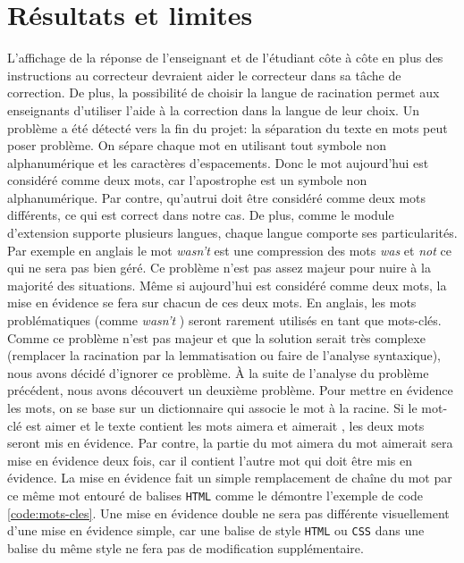 \chapter{R\'esultats et limites}
L'affichage de la r\'eponse de l'enseignant et de l'\'etudiant c\^ote \`a c\^ote en plus des instructions au correcteur devraient aider le correcteur dans sa t\^ache de correction.
De plus, la possibilit\'e de choisir la langue de racination permet aux enseignants d'utiliser l'aide \`a la correction dans la langue de leur choix.
Un probl\`eme a \'et\'e d\'etect\'e vers la fin du projet: la s\'eparation du texte en mots peut poser probl\`eme.
On s\'epare chaque mot en utilisant tout symbole non alphanum\'erique et les caract\`eres d'espacements.
Donc le mot \og aujourd'hui \fg{} est consid\'er\'e comme deux mots, car l'apostrophe est un symbole non alphanum\'erique.
Par contre, \og qu'autrui \fg{} doit \^etre consid\'er\'e comme deux mots diff\'erents, ce qui est correct dans notre cas.
De plus, comme le module d'extension supporte plusieurs langues, chaque langue comporte ses particularit\'es.
Par exemple en anglais le mot \og \textit{wasn't} \fg{} est une compression des mots \og \textit{was} \fg{} et \og \textit{not} \fg{} ce qui ne sera pas bien g\'er\'e.
Ce probl\`eme n'est pas assez majeur pour nuire \`a la majorit\'e des situations.
M\^eme si \og aujourd'hui \fg{} est consid\'er\'e comme deux mots, la mise en \'evidence se fera sur chacun de ces deux mots.
En anglais, les mots probl\'ematiques (comme \og \textit{wasn't} \fg{}) seront rarement utilis\'es en tant que mots-cl\'es.
Comme ce probl\`eme n'est pas majeur et que la solution serait tr\`es complexe (remplacer la racination par la lemmatisation ou faire de l'analyse syntaxique), nous avons d\'ecidé d'ignorer ce probl\`eme.
\`A la suite de l'analyse du probl\`eme pr\'ec\'edent, nous avons d\'ecouvert un deuxi\`eme probl\`eme.
Pour mettre en \'evidence les mots, on se base sur un dictionnaire qui associe le mot \`a la racine.
Si le mot-cl\'e est \og aimer \fg{} et le texte contient les mots \og aimera \fg{} et \og aimerait \fg{}, les deux mots seront mis en \'evidence.
Par contre, la partie du mot \og aimera \fg{} du mot \og aimerait \fg{} sera mise en \'evidence deux fois, car il contient l'autre mot qui doit \^etre mis en \'evidence.
La mise en \'evidence fait un simple remplacement de cha\^ine du mot par ce m\^eme mot entour\'e de balises \texttt{HTML} comme le d\'emontre l'exemple de code \ref{code:mots-cles}.
Une mise en \'evidence double ne sera pas diff\'erente visuellement d'une mise en \'evidence simple, car une balise de style \texttt{HTML} ou \texttt{CSS} dans une balise du m\^eme style ne fera pas de modification suppl\'ementaire.
